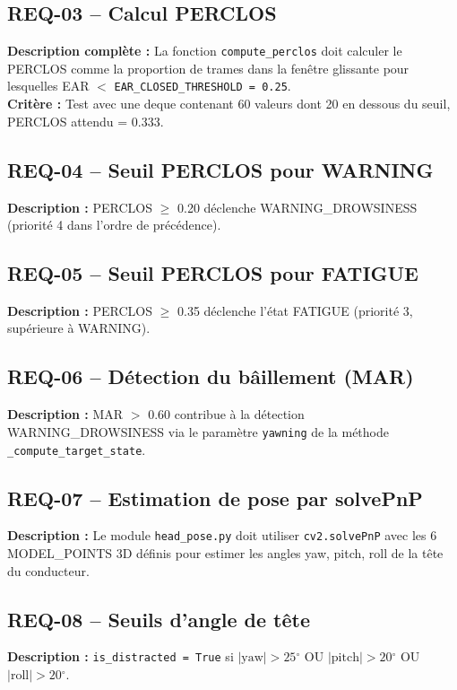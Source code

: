 \documentclass[12pt,a4paper]{report}
\newcommand{\degr}{\ensuremath{^{\circ}}}
\begin{document}
\subsection*{REQ-03 -- Calcul PERCLOS}
\textbf{Description compl\`ete :} La fonction \texttt{compute\_perclos} doit calculer le PERCLOS comme la proportion de trames dans la fen\^etre glissante pour lesquelles EAR $<$ \texttt{EAR\_CLOSED\_THRESHOLD = 0.25}.\\
\textbf{Crit\`ere :} Test avec une deque contenant 60 valeurs dont 20 en dessous du seuil, PERCLOS attendu = 0.333.

\subsection*{REQ-04 -- Seuil PERCLOS pour WARNING}
\textbf{Description :} PERCLOS $\geq$ 0.20 d\'eclenche WARNING\_DROWSINESS (priorit\'e 4 dans l'ordre de pr\'ec\'edence).

\subsection*{REQ-05 -- Seuil PERCLOS pour FATIGUE}
\textbf{Description :} PERCLOS $\geq$ 0.35 d\'eclenche l'\'etat FATIGUE (priorit\'e 3, sup\'erieure \`a WARNING).

\subsection*{REQ-06 -- D\'etection du b\^aillement (MAR)}
\textbf{Description :} MAR $>$ 0.60 contribue \`a la d\'etection WARNING\_DROWSINESS via le param\`etre \texttt{yawning} de la m\'ethode \texttt{\_compute\_target\_state}.

\subsection*{REQ-07 -- Estimation de pose par solvePnP}
\textbf{Description :} Le module \texttt{head\_pose.py} doit utiliser \texttt{cv2.solvePnP} avec les 6 MODEL\_POINTS 3D d\'efinis pour estimer les angles yaw, pitch, roll de la t\^ete du conducteur.

\subsection*{REQ-08 -- Seuils d'angle de t\^ete}
\textbf{Description :} \texttt{is\_distracted = True} si $|\text{yaw}| > 25\degr$ OU $|\text{pitch}| > 20\degr$ OU $|\text{roll}| > 20\degr$.
\end{document}
